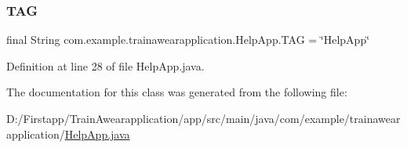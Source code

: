 \subsubsection{\texorpdfstring{TAG}{TAG}}
{\footnotesize\ttfamily final String com.\+example.\+trainawearapplication.\+Help\+App.\+T\+AG = \char`\"{}Help\+App\char`\"{}\hspace{0.3cm}{\ttfamily [package]}}



Definition at line 28 of file Help\+App.\+java.



The documentation for this class was generated from the following file\+:\begin{DoxyCompactItemize}
\item 
D\+:/\+Firstapp/\+Train\+Awearapplication/app/src/main/java/com/example/trainawearapplication/\mbox{\hyperlink{_help_app_8java}{Help\+App.\+java}}\end{DoxyCompactItemize}
